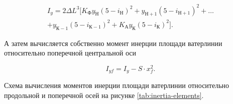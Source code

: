 \begin{equation}
    \begin{split}
    I_y = 2 \Delta L^3 [K_{\text{Ф}} y_{\text{Н}} (5 - i_{\text{Н}})^2 + y_{\text{Н}+1} (5 - i_{\text{Н}+1})^2 + \dots \\
    + y_{\text{К}-1} (5 - i_{\text{К}-1})^2 + K_{\text{А}} y_{\text{К}} (5 - i_{\text{К}})^2].
    \end{split}
\end{equation}

А затем вычисляется собственно момент инерции площади ватерлинии относительно поперечной центральной оси

\begin{equation}
    I_{yf} = I_y - S \cdot x_f^2.
\end{equation}

Схема вычисления моментов инерции площади ватерлинии относительно продольной и поперечной осей на рисунке \ref{tab:inertia-elements}.

